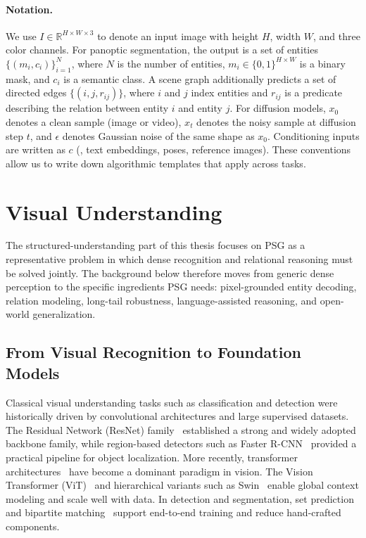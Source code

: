 \paragraph{Notation.}
We use $I \in \mathbb{R}^{H\times W\times 3}$ to denote an input image with height $H$, width $W$, and three color channels. For panoptic segmentation, the output is a set of entities $\{(m_i, c_i)\}_{i=1}^{N}$, where $N$ is the number of entities, $m_i \in \{0,1\}^{H\times W}$ is a binary mask, and $c_i$ is a semantic class. A scene graph additionally predicts a set of directed edges $\{(i,j,r_{ij})\}$, where $i$ and $j$ index entities and $r_{ij}$ is a predicate describing the relation between entity $i$ and entity $j$. For diffusion models, $x_0$ denotes a clean sample (image or video), $x_t$ denotes the noisy sample at diffusion step $t$, and $\epsilon$ denotes Gaussian noise of the same shape as $x_0$. Conditioning inputs are written as $c$ (\eg, text embeddings, poses, reference images). These conventions allow us to write down algorithmic templates that apply across tasks.

\section{Visual Understanding}
The structured-understanding part of this thesis focuses on PSG as a representative problem in which dense recognition and relational reasoning must be solved jointly. The background below therefore moves from generic dense perception to the specific ingredients PSG needs: pixel-grounded entity decoding, relation modeling, long-tail robustness, language-assisted reasoning, and open-world generalization.

\subsection{From Visual Recognition to Foundation Models}
Classical visual understanding tasks such as classification and detection were historically driven by convolutional architectures and large supervised datasets. The Residual Network (ResNet) family~\citep{he2016deep} established a strong and widely adopted backbone family, while region-based detectors such as Faster R-CNN~\citep{ren2015faster} provided a practical pipeline for object localization. More recently, transformer architectures~\citep{vaswani2017attention} have become a dominant paradigm in vision. The Vision Transformer (ViT)~\citep{dosovitskiy2020image} and hierarchical variants such as Swin~\citep{liu2021swin} enable global context modeling and scale well with data. In detection and segmentation, set prediction and bipartite matching~\citep{carion2020end} support end-to-end training and reduce hand-crafted components.

